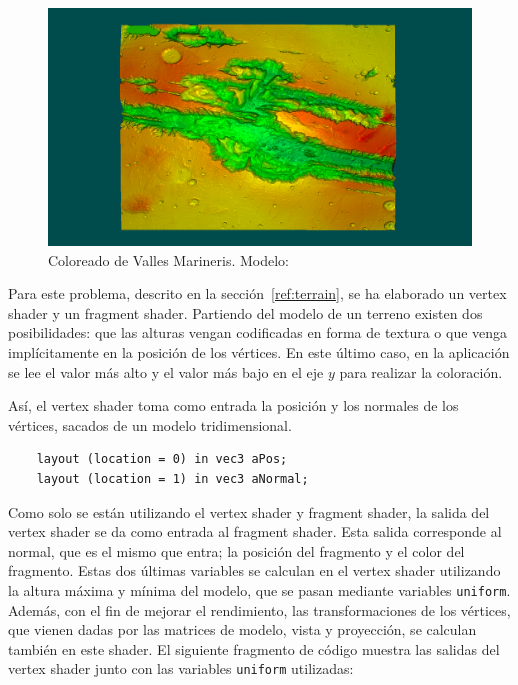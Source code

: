 \begin{figure}[ht]
	\centering
	\includegraphics[width=\textwidth]{figures/myterrain.png}
	\caption[Coloreado de Valles Marineris.]{Coloreado de Valles Marineris.
	Modelo:~\cite{NASA}}
	\label{fig:myterrain}
\end{figure}

Para este problema, descrito en la sección~\ref{ref:terrain}, se ha elaborado un
vertex shader y un fragment shader. Partiendo del modelo de un terreno existen
dos posibilidades: que las alturas vengan codificadas en forma de textura o que
venga implícitamente en la posición de los vértices. En este último caso, en la
aplicación se lee el valor más alto y el valor más bajo en el eje $y$ para
realizar la coloración. 

Así, el vertex shader toma como entrada la posición y los normales de los
vértices, sacados de un modelo tridimensional.

\begin{verbatim}
    layout (location = 0) in vec3 aPos;
    layout (location = 1) in vec3 aNormal;
\end{verbatim}

Como solo se están utilizando el vertex shader y fragment shader, la salida del
vertex shader se da como entrada al fragment shader. Esta salida corresponde al
normal, que es el mismo que entra; la posición del fragmento y el color del
fragmento. Estas dos últimas variables se calculan en el vertex shader
utilizando la altura máxima y mínima del modelo, que se pasan mediante variables
\verb|uniform|.  Además, con el fin de mejorar el rendimiento, las
transformaciones de los vértices, que vienen dadas por las matrices de modelo,
vista y proyección, se calculan también en este shader. El siguiente fragmento
de código muestra las salidas del vertex shader junto con las variables
\verb|uniform| utilizadas:

